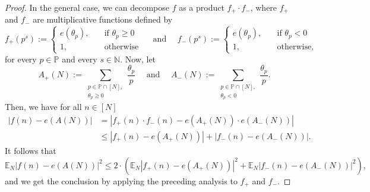 \documentclass[10pt,a4paper]{amsart}
\newcommand{\E}{{\mathbb E}}
\newcommand{\N}{{\mathbb N}}
\renewcommand{\P}{{\mathbb P}}
\begin{document}
\begin{proof}
	In the general case, we can decompose $f$ as a product $f_+\cdot f_-$, where $f_+$ and $f_-$ are multiplicative functions defined by
	$$ f_+(p^s) := \begin{cases}
                    e(\theta_p),\quad  & \text{if }\theta_p\geq0\\
	                1,\quad   &\text{otherwise}
	              \end{cases}
    \quad\text{ and }\quad
    f_-(p^s) := \begin{cases}
                    e(\theta_p),\quad  &\text{if }\theta_p<0\\
	                1, \quad  &\text{otherwise,}
	              \end{cases}
    $$
	for every $p\in\P$ and every $s\in\N$. Now, let
	$$
	A_+(N):=\sum_{\substack{p\in \P\cap [N],\\ \theta_p\geq0}}  \frac{\theta_p}{p}
	\quad\text{ and }\quad
	A_-(N):=\sum_{\substack{p\in \P\cap [N],\\ \theta_p<0}}  \frac{\theta_p}{p}.
	$$
	Then, we have for all $n\in[N]$
	\begin{align*}
	|f(n)-e(A(N))| &= |f_+(n)\cdot f_-(n)-e(A_+(N))\cdot e(A_-(N))| \\
	&\leq |f_+(n)-e(A_+(N))| + |f_-(n)-e(A_-(N))|.
	\end{align*}
	It follows   that
	$$
	\E_N |f(n)-e(A(N))|^2 \leq 2\cdot \left(\E_N |f_+(n)-e(A_+(N))|^2 +
	\E_N |f_-(n)-e(A_-(N))|^2\right),
	$$
	and we get the conclusion by applying the preceding analysis to $f_+$ and $f_-$.
\end{proof}	 	
\end{document}
